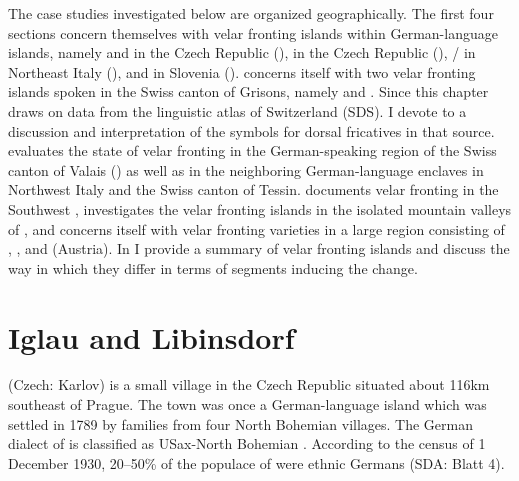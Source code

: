 \begin{sloppypar}
The case studies investigated below are organized geographically. The first four sections concern themselves with velar fronting islands within German-language islands, namely  and  in the Czech Republic (),  in the Czech Republic (), / in Northeast Italy (), and  in Slovenia ().  concerns itself with two velar fronting islands spoken in the Swiss canton of Grisons, namely  and . Since this chapter draws on data from the linguistic atlas of Switzerland (SDS). I devote  to a discussion and interpretation of the symbols for dorsal fricatives in that source.  evaluates the state of velar fronting in the German-speaking region of the Swiss canton of  Valais () as well as in the neighboring German-language enclaves in Northwest Italy and the Swiss canton of Tessin.  documents velar fronting in the Southwest ,  investigates the velar fronting islands in the isolated mountain valleys of , and  concerns itself with velar fronting varieties in a large region consisting of , , and  (Austria). In  I provide a summary of velar fronting islands and discuss the way in which they differ in terms of segments inducing the change.
\end{sloppypar}

\section{{Iglau} {and} {Libinsdorf}}\label{sec:15.2}

 (Czech: Karlov) is a small village in the Czech Republic situated about 116km southeast of Prague. The town was once a German-language island which was settled in 1789 by families from four North Bohemian villages. The German dialect of  is classified as USax-North Bohemian \citep[915]{Wiesinger1983b}. According to the census of 1 December 1930, 20--50\% of the populace of  were ethnic Germans (SDA: Blatt 4).

